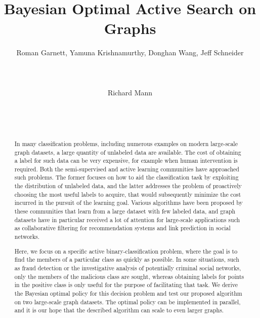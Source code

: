 \documentclass{acm_proc_article-sp}
\begin{document}
\title{Bayesian Optimal Active Search on Graphs}

\author{
  \alignauthor
  Roman Garnett, Yamuna Krishnamurthy, Donghan Wang, Jeff Schneider\\
  \\
  \\
  \\
  \alignauthor
  \vspace*{0.5\baselineskip}
  Richard Mann\\
  \\
  \\
  \\
}

\maketitle

\begin{abstract}
  In many classification problems, including numerous examples on
  modern large-scale graph datasets, a large quantity of unlabeled
  data are available. The cost of obtaining a label for such data can be
  very expensive, for example when human intervention is required.
  Both the semi-supervised and active learning communities have
  approached such problems.  The former focuses on how to aid the
  classification task by exploiting the distribution of unlabeled
  data, and the latter addresses the problem of proactively choosing
  the most useful labels to acquire, that would subsequently minimize 
  the cost incurred in the pursuit of the learning goal. Various algorithms
  have been proposed by these communities that learn from a large dataset with few
  labeled data, and graph datasets have in particular received a lot of
  attention for large-scale applications such as collaborative
  filtering for recommendation systems and link prediction in social
  networks.

  Here, we focus on a specific active binary-classification problem,
  where the goal is to find the members of a particular class as
  quickly as possible.  In some situations, such as fraud detection or
  the investigative analysis of potentially criminal social networks,
  only the members of the malicious class are sought, whereas
  obtaining labels for points in the positive class is only useful for
  the purpose of facilitating that task.  We derive the Bayesian
  optimal policy for this decision problem and test our proposed
  algorithm on two large-scale graph datasets.  The optimal policy can
  be implemented in parallel, and it is our hope that the described
  algorithm can scale to even larger graphs.
\end{abstract}
\end{document}
